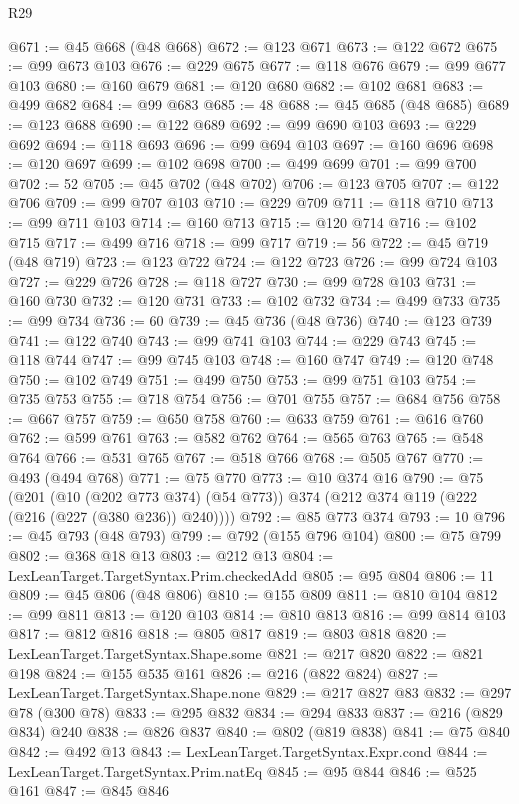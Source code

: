 \begin{lexlean}{R29}
\begin{coremodule}
@671 := @45 @668 (@48 @668)
@672 := @123 @671
@673 := @122 @672
@675 := @99 @673 @103
@676 := @229 @675
@677 := @118 @676
@679 := @99 @677 @103
@680 := @160 @679
@681 := @120 @680
@682 := @102 @681
@683 := @499 @682
@684 := @99 @683
@685 := 48
@688 := @45 @685 (@48 @685)
@689 := @123 @688
@690 := @122 @689
@692 := @99 @690 @103
@693 := @229 @692
@694 := @118 @693
@696 := @99 @694 @103
@697 := @160 @696
@698 := @120 @697
@699 := @102 @698
@700 := @499 @699
@701 := @99 @700
@702 := 52
@705 := @45 @702 (@48 @702)
@706 := @123 @705
@707 := @122 @706
@709 := @99 @707 @103
@710 := @229 @709
@711 := @118 @710
@713 := @99 @711 @103
@714 := @160 @713
@715 := @120 @714
@716 := @102 @715
@717 := @499 @716
@718 := @99 @717
@719 := 56
@722 := @45 @719 (@48 @719)
@723 := @123 @722
@724 := @122 @723
@726 := @99 @724 @103
@727 := @229 @726
@728 := @118 @727
@730 := @99 @728 @103
@731 := @160 @730
@732 := @120 @731
@733 := @102 @732
@734 := @499 @733
@735 := @99 @734
@736 := 60
@739 := @45 @736 (@48 @736)
@740 := @123 @739
@741 := @122 @740
@743 := @99 @741 @103
@744 := @229 @743
@745 := @118 @744
@747 := @99 @745 @103
@748 := @160 @747
@749 := @120 @748
@750 := @102 @749
@751 := @499 @750
@753 := @99 @751 @103
@754 := @735 @753
@755 := @718 @754
@756 := @701 @755
@757 := @684 @756
@758 := @667 @757
@759 := @650 @758
@760 := @633 @759
@761 := @616 @760
@762 := @599 @761
@763 := @582 @762
@764 := @565 @763
@765 := @548 @764
@766 := @531 @765
@767 := @518 @766
@768 := @505 @767
@770 := @493 (@494 @768)
@771 := @75 @770
@773 := @10 @374 @16
@790 := @75
    (@201
      (@10 (@202 @773 @374) (@54 @773))
      @374
      (@212 @374 @119 (@222 (@216 (@227 (@380 @236)) @240))))
@792 := @85 @773 @374
@793 := 10
@796 := @45 @793 (@48 @793)
@799 := @792 (@155 @796 @104)
@800 := @75 @799
@802 := @368 @18 @13
@803 := @212 @13
@804 := LexLeanTarget.TargetSyntax.Prim.checkedAdd
@805 := @95 @804
@806 := 11
@809 := @45 @806 (@48 @806)
@810 := @155 @809
@811 := @810 @104
@812 := @99 @811
@813 := @120 @103
@814 := @810 @813
@816 := @99 @814 @103
@817 := @812 @816
@818 := @805 @817
@819 := @803 @818
@820 := LexLeanTarget.TargetSyntax.Shape.some
@821 := @217 @820
@822 := @821 @198
@824 := @155 @535 @161
@826 := @216 (@822 @824)
@827 := LexLeanTarget.TargetSyntax.Shape.none
@829 := @217 @827 @83
@832 := @297 @78 (@300 @78)
@833 := @295 @832
@834 := @294 @833
@837 := @216 (@829 @834) @240
@838 := @826 @837
@840 := @802 (@819 @838)
@841 := @75 @840
@842 := @492 @13
@843 := LexLeanTarget.TargetSyntax.Expr.cond
@844 := LexLeanTarget.TargetSyntax.Prim.natEq
@845 := @95 @844
@846 := @525 @161
@847 := @845 @846

\end{coremodule}
\end{lexlean}
